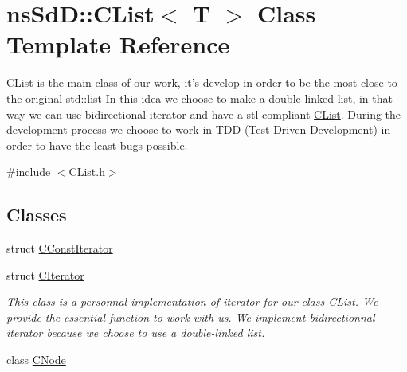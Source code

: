 \hypertarget{classnsSdD_1_1CList}{\section{ns\+Sd\+D\+:\+:C\+List$<$ T $>$ Class Template Reference}
\label{classnsSdD_1_1CList}
}


\hyperlink{classnsSdD_1_1CList}{C\+List} is the main class of our work, it's develop in order to be the most close to the original std\+::list In this idea we choose to make a double-\/linked list, in that way we can use bidirectional iterator and have a stl compliant \hyperlink{classnsSdD_1_1CList}{C\+List}. During the development process we choose to work in T\+D\+D (Test Driven Development) in order to have the least bugs possible.  




{\ttfamily \#include $<$C\+List.\+h$>$}

\subsection*{Classes}
\begin{DoxyCompactItemize}
\item 
struct \hyperlink{structnsSdD_1_1CList_1_1CConstIterator}{C\+Const\+Iterator}
\item 
struct \hyperlink{structnsSdD_1_1CList_1_1CIterator}{C\+Iterator}
\begin{DoxyCompactList}\small\item\em This class is a personnal implementation of iterator for our class \hyperlink{classnsSdD_1_1CList}{C\+List}. We provide the essential function to work with us. We implement bidirectionnal iterator because we choose to use a double-\/linked list. \end{DoxyCompactList}\item 
class \hyperlink{classnsSdD_1_1CList_1_1CNode}{C\+Node}
\end{DoxyCompactItemize}

